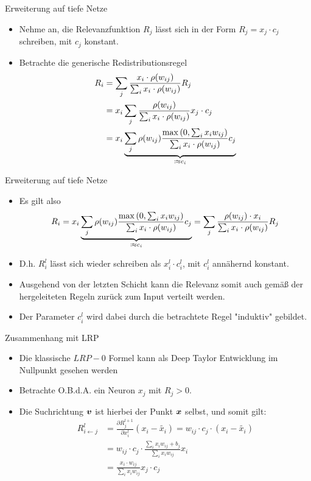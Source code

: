 \begin{frame}{Erweiterung auf tiefe Netze}
\begin{itemize}
\item Nehme an, die Relevanzfunktion $R_j$ lässt sich in der Form $R_j = x_j \cdot c_j$ schreiben, mit $c_j$ konstant.
\item Betrachte die generische Redistributionsregel
\begin{align*}
R_i &= \sum_{j} \frac{x_{i} \cdot \rho(w_{i j})}{\sum_{i} x_{i} \cdot \rho(w_{i j})} R_{j}\\
& = x_{i} \sum_{j}  \frac{ \rho(w_{i j})}{\sum_{i} x_{i} \cdot \rho(w_{i j})} x_j \cdot c_j \\
&= x_i \underbrace{\sum_{j}   \rho(w_{i j}) \frac{\max \left(0, \sum_{i} x_{i} w_{i j}\right)}{\sum_{i} x_{i} \cdot \rho(w_{i j})} c_j}_{\colonapprox c_i}
\end{align*}
\end{itemize}
\end{frame}

\begin{frame}{Erweiterung auf tiefe Netze}
\begin{itemize}
\item Es gilt also
\begin{align*}
R_i = x_i \underbrace{\sum_{j}   \rho(w_{i j}) \frac{\max \left(0, \sum_{i} x_{i} w_{i j}\right)}{\sum_{i} x_{i} \cdot \rho(w_{i j})} c_j}_{\colonapprox c_i} = \sum_{j}    \frac{\rho(w_{i j}) \cdot x_i}{\sum_{i} x_{i} \cdot \rho(w_{i j})} R_j
\end{align*}
\item D.h. $R_i^l$ lässt sich wieder schreiben als $x_i^l \cdot c_i^l$, mit $c_i^l$ annähernd konstant.
\item Ausgehend von der letzten Schicht kann die Relevanz somit auch gemäß der hergeleiteten Regeln zurück zum Input verteilt werden.
\item Der Parameter $c_i^l$ wird dabei durch die betrachtete Regel "{}induktiv"{} gebildet.
\end{itemize}
\end{frame}


\begin{frame}{Zusammenhang mit LRP}
\begin{itemize}
\item Die klassische $LRP-0$ Formel kann als Deep Taylor Entwicklung im Nullpunkt gesehen werden
\item Betrachte O.B.d.A. ein Neuron $x_j$ mit $R_j > 0$. 
\item Die Suchrichtung $\boldsymbol{v}$ ist hierbei der Punkt $\boldsymbol{x}$ selbst, und somit gilt:
\pause
\begin{align*}
R_{i \leftarrow j}^l &=\frac{\partial R_{j}^{l+1}}{\partial x_{i}^l}
(x_i - \tilde{x_i})  = w_{ij} \cdot c_j \cdot (x_i - \tilde{x_i}) \\
&= w_{ij} \cdot c_j \cdot \frac{\sum_{i} x_{i} w_{i j}+b_{j}}{\sum_{i} x_{i} w_{i j}} x_i\\
&= \frac{x_i \cdot w_{ij}}{\sum_{i} x_{i} w_{i j}} x_j \cdot c_j
\end{align*}
\end{itemize}
\end{frame}


